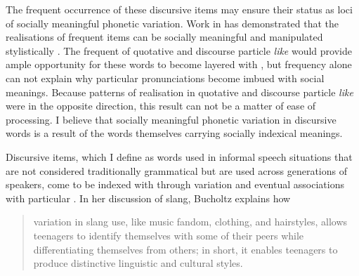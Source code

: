 The frequent occurrence of these discursive items may ensure their status as loci of socially meaningful phonetic variation. Work in  has demonstrated that the realisations of frequent items can be socially meaningful and manipulated stylistically \citep{oprah1999}. The frequent  of quotative and discourse particle \textit{like} would provide ample opportunity for these words to become layered with , but frequency alone can not explain why particular pronunciations become imbued with social meanings. Because patterns of  realisation in quotative and discourse particle \textit{like} were in the opposite direction, this result can not be a matter of ease of processing. I believe that socially meaningful phonetic variation in discursive words is a result of the words themselves carrying socially indexical meanings.


Discursive items, which I define as words used in informal speech situations that are not considered traditionally grammatical but are used across generations of speakers, come to be indexed with  through variation and eventual associations with particular . In her discussion of slang, Bucholtz explains how

\begin{quote}
	variation in slang use, like music fandom, clothing, and hairstyles, allows teenagers to identify themselves with some of their peers while differentiating themselves from others; in short, it enables teenagers to produce distinctive linguistic and cultural styles. \citep[251]{bucholtz2006}
\end{quote}

